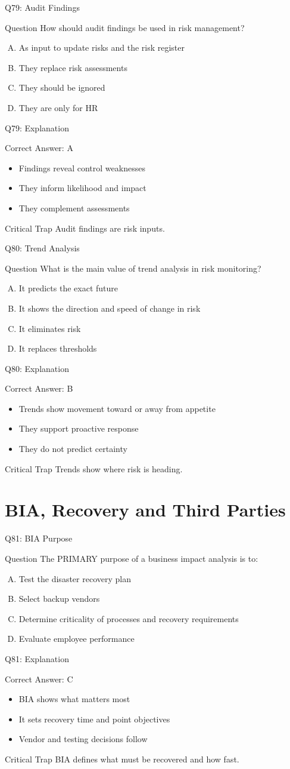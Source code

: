 \documentclass[aspectratio=169]{beamer}
\newcommand{\hq}[7]{%
	\begin{frame}{Q#1: #2}
		\begin{block}{Question}
			#3
		\end{block}
		\begin{enumerate}[(A)]
			#4
		\end{enumerate}
	\end{frame}
	\begin{frame}{Q#1: Explanation}
		\begin{block}{Correct Answer: #5}
			\begin{itemize}
				#6
			\end{itemize}
		\end{block}
		\begin{alertblock}{Critical Trap}
			#7
		\end{alertblock}
	\end{frame}
}
\begin{document}
	\hq{79}{Audit Findings}
	{How should audit findings be used in risk management?}
	{\item As input to update risks and the risk register
		\item They replace risk assessments
		\item They should be ignored
		\item They are only for HR}
	{A}
	{\item Findings reveal control weaknesses
		\item They inform likelihood and impact
		\item They complement assessments}
	{Audit findings are risk inputs.}
	
	\hq{80}{Trend Analysis}
	{What is the main value of trend analysis in risk monitoring?}
	{\item It predicts the exact future
		\item It shows the direction and speed of change in risk
		\item It eliminates risk
		\item It replaces thresholds}
	{B}
	{\item Trends show movement toward or away from appetite
		\item They support proactive response
		\item They do not predict certainty}
	{Trends show where risk is heading.}
	
	\section{BIA, Recovery and Third Parties}
	
	\hq{81}{BIA Purpose}
	{The PRIMARY purpose of a business impact analysis is to:}
	{\item Test the disaster recovery plan
		\item Select backup vendors
		\item Determine criticality of processes and recovery requirements
		\item Evaluate employee performance}
	{C}
	{\item BIA shows what matters most
		\item It sets recovery time and point objectives
		\item Vendor and testing decisions follow}
	{BIA defines what must be recovered and how fast.}
	
\end{document}

